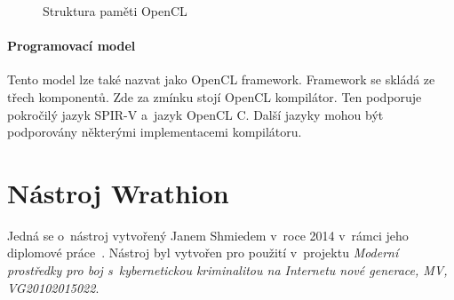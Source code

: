 \begin{figure}[ht]
    \begin{center}
    \end{center}
    \caption{Struktura paměti OpenCL \cite{Khronos:2015}}
    \label{memory}
\end{figure}
\subsubsection{Programovací model}
Tento model lze také nazvat jako OpenCL framework. Framework se skládá ze třech komponentů. Zde za
zmínku stojí OpenCL kompilátor. Ten podporuje pokročilý jazyk SPIR-V a~jazyk OpenCL C. Další
jazyky mohou být podporovány některými implementacemi kompilátoru.


\chapter{Nástroj Wrathion}
\label{ch:wrathion}
Jedná se o~nástroj vytvořený Janem Shmiedem v~roce 2014 v~rámci jeho diplomové
práce~\cite{Schmied}. Nástroj byl vytvořen pro použití v~projektu {\it Moderní prostředky pro 
boj s~kybernetickou kriminalitou na Internetu nové generace, MV, VG20102015022}.
